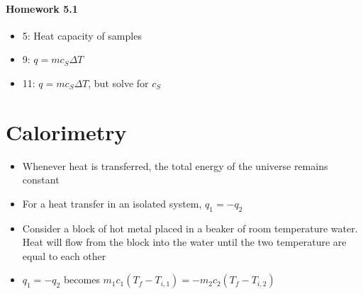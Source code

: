 \documentclass[12pt, openany, letterpaper]{memoir}
\begin{document}
\paragraph*{Homework 5.1}
\begin{itemize}
  \item 5: Heat capacity of samples
  \item 9: $q=mc_S\Delta T$
  \item 11: $q=mc_S\Delta T$, but solve for $c_S$
\end{itemize}

\section{Calorimetry}
\begin{itemize}
  \item Whenever heat is transferred, the total energy of the universe remains constant
	\item For a heat transfer in an isolated system, $q_1=-q_2$
	\item Consider a block of hot metal placed in a beaker of room temperature water. Heat will flow from the block into the water until the two temperature are equal to each other
	\item $q_1=-q_2$ becomes $m_1c_1\left(T_f-T_{i,1}\right)=-m_2c_2\left(T_f-T_{i,2}\right)$


\end{itemize}
\end{document}
